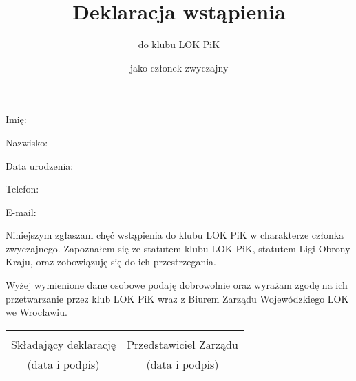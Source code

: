 \documentclass[a4paper,12pt]{article}
\title{Deklaracja wstąpienia}
\author{do klubu LOK PiK}
\date{jako członek zwyczajny}
\begin{document}
\maketitle
\thispagestyle{empty} %
Imię: \dotfill
\vspace{1em}

Nazwisko: \dotfill
\vspace{1em}

Data urodzenia: \dotfill
\vspace{1em}

Telefon: \dotfill
\vspace{1em}

E-mail: \dotfill
\vspace{1em}

Niniejszym zgłaszam chęć wstąpienia do klubu LOK PiK w charakterze członka zwyczajnego. Zapoznałem się ze statutem klubu LOK PiK, statutem Ligi Obrony Kraju, oraz zobowiązuję się do ich przestrzegania.

Wyżej wymienione dane osobowe podaję dobrowolnie oraz wyrażam zgodę na ich przetwarzanie przez klub LOK PiK wraz z Biurem Zarządu Wojewódzkiego LOK we Wrocławiu.
\vspace{4em}
\begin{center}
	\begin{tabular}{ c c }
		\dotfill & \dotfill \\
		Składający deklarację & Przedstawiciel Zarządu\\
		(data i podpis) & (data i podpis)
	\end{tabular}
\end{center}
\end{document}
